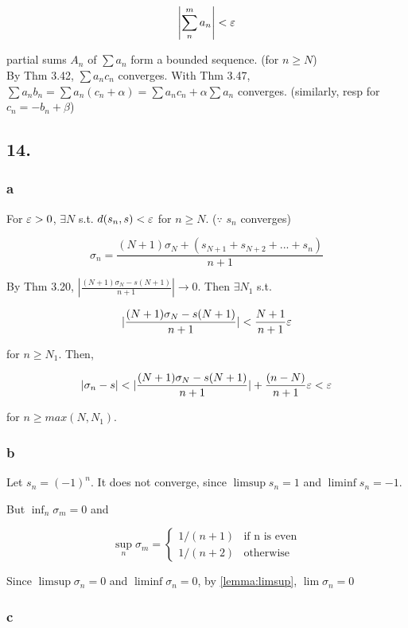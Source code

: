 \documentclass[11pt]{article}
\begin{document}
\[
\abs*{\sum_{n}^{m} a_n} < \eps
\]

partial sums $A_n$ of $\sum a_n$ form a bounded sequence. (for $n \geq N$)\\
By Thm 3.42, $\sum a_n c_n$ converges. With Thm 3.47, $\sum a_n b_n = \sum a_n (c_n+\alpha) = \sum a_n c_n + \alpha \sum a_n$ converges. (similarly, resp for $c_n=-b_n+\beta$)

\subsection*{14.}

\subsubsection*{a}

For $\eps > 0$, $\exists N$ s.t. $d(s_n,s)<\eps$ for $n \geq N$. ($\because$ $s_n$ converges)

\[
\sigma_n = \frac{(N+1)\sigma_N+(s_{N+1}+s_{N+2}+...+s_n)}{n+1}
\]

By Thm 3.20, $|\frac{(N+1)\sigma_N-s(N+1)}{n+1}| \to 0$. Then $\exists N_1$ s.t.

\[
|\frac{(N+1)\sigma_N-s(N+1)}{n+1}|<\frac{N+1}{n+1}\eps
\]

for $n \geq N_1$. Then, 

\[
|\sigma_n-s| < |\frac{(N+1)\sigma_N-s(N+1)}{n+1}|+\frac{(n-N)}{n+1}\eps < \eps
\]

for $n \geq max(N, N_1)$.

\subsubsection*{b}

Let $s_n=(-1)^n$. It does not converge, since $\limsup s_n=1$ and $\liminf s_n=-1$.

But $\inf_n \sigma_m = 0$ and

\[
\sup_n \sigma_m=\begin{cases}
    1/(n+1) & \text{if n is even}\\
    1/(n+2) & \text{otherwise}
\end{cases}
\]

Since $\limsup \sigma_n=0$ and $\liminf \sigma_n=0$, by \cref{lemma:limsup}, $\lim \sigma_n=0$

\subsubsection*{c}
\end{document}
